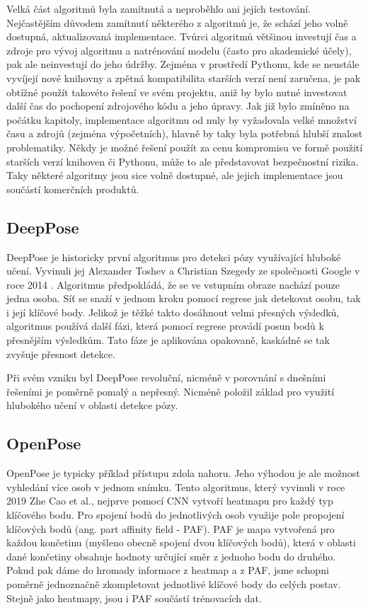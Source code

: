Velká část algoritmů byla zamítnutá a neproběhlo ani jejích testování.
Nejčastějším důvodem zamítnutí některého z algoritmů je, že schází jeho volně
dostupná, aktualizovaná implementace. Tvůrci algoritmů většinou investují čas a
zdroje pro vývoj algoritmu a natrénování modelu (často pro akademické účely),
pak ale neinvestují do jeho údržby. Zejména v prostředí Pythonu, kde se
neustále vyvíjejí nové knihovny a zpětná kompatibilita starších verzí není
zaručena, je pak obtížné použít takovéto řešení ve svém projektu, aniž by bylo
nutné investovat další čas do pochopení zdrojového kódu a jeho úpravy. Jak již
bylo zmíněno na počátku kapitoly, implementace algoritmu od nuly by vyžadovala
velké množství času a zdrojů (zejména výpočetních), hlavně by taky byla
potřebná hlubší znalost problematiky. Někdy je možné řešení použít za cenu
kompromisu ve formě použití starších verzí knihoven či Pythonu, může to ale
představovat bezpečnostní rizika. Taky některé algoritmy jsou sice volně
dostupné, ale jejich implementace jsou součástí komerčních produktů. %

\subsection{DeepPose}
DeepPose je historicky první algoritmus pro detekci pózy využívající hluboké
učení. Vyvinuli jej Alexander Toshev a Christian Szegedy ze společnosti Google
v roce 2014 \cite{deeppose}. Algoritmus předpokládá, že se ve vstupním obraze
nachází pouze jedna osoba. Síť se snaží v jednom kroku pomocí regrese jak
detekovat osobu, tak i její klíčové body. Jelikož je těžké takto dosáhnout
velmi přesných výsledků, algoritmus používá další fázi, která pomocí regrese
provádí posun bodů k přesnějším výsledkům. Tato fáze je aplikována opakovaně,
kaskádně se tak zvyšuje přesnost detekce.

Při svém vzniku byl DeepPose revoluční, nicméně v porovnání s dnešními řešeními
je poměrně pomalý a nepřesný. Nicméně položil základ pro využití hlubokého
učení v oblasti detekce pózy.

\subsection{OpenPose}

OpenPose \cite{openpose} je typicky příklad přístupu zdola nahoru. Jeho výhodou
je ale možnost vyhledání více osob v jednom snímku. Tento algoritmus, který
vyvinuli v roce 2019 Zhe Cao et al., nejprve pomocí CNN vytvoří heatmapu pro
každý typ klíčového bodu. Pro spojení bodů do jednotlivých osob využije pole
propojení klíčových bodů (ang. part affinity field - PAF). PAF je mapa
vytvořená pro každou končetinu (myšleno obecně spojení dvou klíčových bodů),
která v oblasti dané končetiny obsahuje hodnoty určující směr z jednoho bodu do
druhého. Pokud pak dáme do hromady informace z heatmap a z PAF, jsme schopni
poměrně jednoznačně zkompletovat jednotlivé klíčové body do celých postav.
Stejně jako heatmapy, jsou i PAF součástí trénovacích dat.

